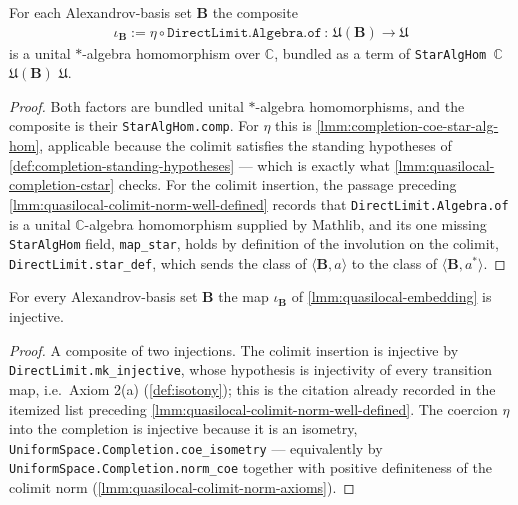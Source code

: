 \begin{lemma}
    \label{lmm:quasilocal-embedding}
    \leanok
    For each Alexandrov-basis set $\mathbf{B}$ the composite
    \begin{align}
        \iota_{\mathbf{B}} := \eta \circ \texttt{DirectLimit.Algebra.of} \, : \, \mathfrak{U}(\mathbf{B}) \longrightarrow \mathfrak{U}
    \end{align}
    is a unital $*$-algebra homomorphism over $\mathbb{C}$, bundled as a term of \texttt{StarAlgHom \ensuremath{\mathbb{C}}} $\mathfrak{U}(\mathbf{B})$ $\mathfrak{U}$.
\end{lemma}
\begin{proof}
    \leanok
    Both factors are bundled unital $*$-algebra homomorphisms, and the composite is their \texttt{StarAlgHom.comp}. For $\eta$ this is \ref{lmm:completion-coe-star-alg-hom}, applicable because the colimit satisfies the standing hypotheses of \ref{def:completion-standing-hypotheses} --- which is exactly what \ref{lmm:quasilocal-completion-cstar} checks. For the colimit insertion, the passage preceding \ref{lmm:quasilocal-colimit-norm-well-defined} records that \texttt{DirectLimit.Algebra.of} is a unital $\mathbb{C}$-algebra homomorphism supplied by Mathlib, and its one missing \texttt{StarAlgHom} field, \texttt{map\_star}, holds by definition of the involution on the colimit, \texttt{DirectLimit.star\_def}, which sends the class of $\langle \mathbf{B}, a \rangle$ to the class of $\langle \mathbf{B}, a^{*} \rangle$.
\end{proof}

\begin{lemma}
    \label{lmm:quasilocal-embedding-injective}
    \leanok
    For every Alexandrov-basis set $\mathbf{B}$ the map $\iota_{\mathbf{B}}$ of \ref{lmm:quasilocal-embedding} is injective.
\end{lemma}
\begin{proof}
    \leanok
    A composite of two injections. The colimit insertion is injective by \texttt{DirectLimit.mk\_injective}, whose hypothesis is injectivity of every transition map, i.e.\ Axiom 2(a) (\ref{def:isotony}); this is the citation already recorded in the itemized list preceding \ref{lmm:quasilocal-colimit-norm-well-defined}. The coercion $\eta$ into the completion is injective because it is an isometry, \texttt{UniformSpace.Completion.coe\_isometry} --- equivalently by \texttt{UniformSpace.Completion.norm\_coe} together with positive definiteness of the colimit norm (\ref{lmm:quasilocal-colimit-norm-axioms}).
\end{proof}

